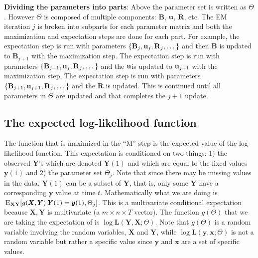 \documentclass[]{article}
\def\UPS{\mbox{\boldmath $\Upsilon$}}
\def\BB{\mbox{$\mathbf B$}}	\def\bb{\mbox{$\mathbf b$}} \def\Bb{\mbox{$\mathbf J$}} \def\Ba{\mbox{$\mathbf L$}} \def\Bm{\UPS}
\def\EXy{\,\textup{\textrm{E}}_{\text{{\bf XY}}}}
\def\LL{\mbox{$\mathbf L$}}	\def\ll{\mbox{$\mathbf l$}}
\def\RR{\mbox{$\mathbf R$}}	 \def\rr{\mbox{$\mathbf r$}} \def\Rb{\mbox{$\mathbf H$}}	\def\Rm{\mathbb{R}}
\def\XX{\mbox{$\pmb{X}$}}	\def\xx{\mbox{$\pmb{x}$}}
\def\YY{\mbox{$\pmb{Y}$}}	\def\yy{\mbox{$\pmb{y}$}}
\begin{document}
\textbf{Dividing the parameters into parts}: Above the parameter set is written as $\Theta$. However $\Theta$ is composed of multiple components: $\BB$, $\mbox{$\mathbf u$}$, $\RR$, etc. The EM iteration $j$ is broken into subparts for each parameter matrix and both the maximization and expectation steps are done for each part. For example, the expectation step is run with parameters $\{\BB_j, \uu_j, \RR_j, \dots\}$ and then $\BB$ is updated to $\BB_{j+1}$ with the maximization step. The expectation step is run with parameters $\{\BB_{j+1}, \uu_j, \RR_j, \dots \}$ and the $\mbox{$\mathbf u$}$is updated to $\mbox{$\mathbf u$}_{j+1}$ with the maximization step. The expectation step is run with parameters $\{\BB_{j+1}, \uu_{j+1}, \RR_j, \dots \}$ and the $\RR$ is updated. This is continued until all parameters in $\Theta$ are updated and that completes the $j+1$ update.

\subsection{The expected log-likelihood function}\label{sec:expLL}
The function that is maximized in the ``M'' step is the expected value of the log-likelihood function. This expectation is conditioned on two things: 1) the observed $\YY$'s which are denoted $\YY(1)$ and which are equal to the fixed values $\yy(1)$ and 2) the parameter set $\Theta_j$.  Note that since there may be missing values in the data, $\YY(1)$ can be a subset of $\YY$, that is, only some $\YY$ have a corresponding $\yy$ value at time $t$.  Mathematically what we are doing is $\EXy[g(\XX,\YY)|\YY(1)=\yy(1),\Theta_j]$.  This is a multivariate conditional expectation because $\XX,\YY$ is multivariate (a $m \times n \times T$ vector). The function $g(\Theta)$ that we are taking the expectation of is $\log\LL(\YY,\XX ; \Theta)$. Note that $g(\Theta)$ is a random variable involving the random variables, $\XX$ and $\YY$, while $\log\LL(\yy,\xx ; \Theta)$ is not a random variable but rather a specific value since $\yy$ and $\xx$ are a set of specific values.
\end{document}
